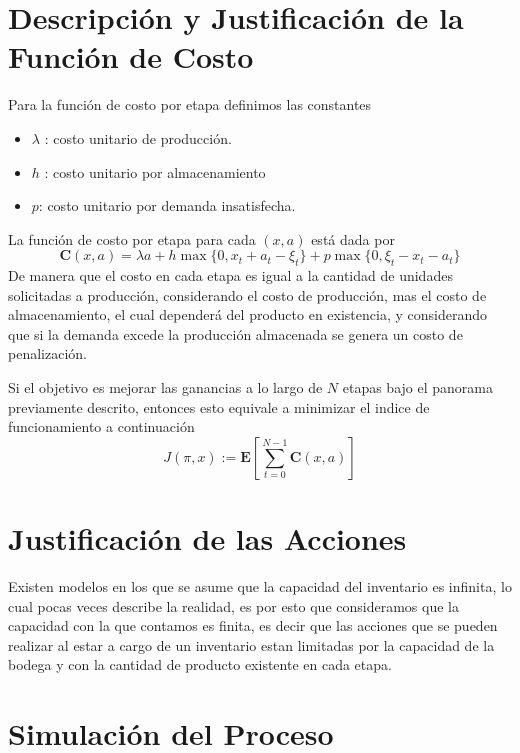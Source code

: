 \documentclass[
  us-letterpaper,
  DIV=11,
  numbers=noendperiod]{scrreprt}
\begin{document}

\chapter{Descripción y Justificación de la Función de
Costo}\label{descripciuxf3n-y-justificaciuxf3n-de-la-funciuxf3n-de-costo}

Para la función de costo por etapa definimos las constantes

\begin{itemize}
\item
  \(\lambda\) : costo unitario de producción.
\item
  \(h\) : costo unitario por almacenamiento
\item
  \(p\): costo unitario por demanda insatisfecha.
\end{itemize}

La función de costo por etapa para cada \((x,a)\) está dada por \[
\mathbf{C}(x,a)=\lambda a+h\max\{0,x_t+a_t-\xi_t\}+p\max\{0,\xi_t-x_t-a_t\}
\] De manera que el costo en cada etapa es igual a la cantidad de
unidades solicitadas a producción, considerando el costo de producción,
mas el costo de almacenamiento, el cual dependerá del producto en
existencia, y considerando que si la demanda excede la producción
almacenada se genera un costo de penalización.

Si el objetivo es mejorar las ganancias a lo largo de \(N\) etapas bajo
el panorama previamente descrito, entonces esto equivale a minimizar el
indice de funcionamiento a continuación \[
J(\pi,x):= \mathbf{E}[\sum_{t=0}^{N-1}\mathbf{C}(x,a)]
\]


\chapter{Justificación de las
Acciones}\label{justificaciuxf3n-de-las-acciones}

Existen modelos en los que se asume que la capacidad del inventario es
infinita, lo cual pocas veces describe la realidad, es por esto que
consideramos que la capacidad con la que contamos es finita, es decir
que las acciones que se pueden realizar al estar a cargo de un
inventario estan limitadas por la capacidad de la bodega y con la
cantidad de producto existente en cada etapa.


\chapter{Simulación del Proceso}\label{simulaciuxf3n-del-proceso}
\end{document}
